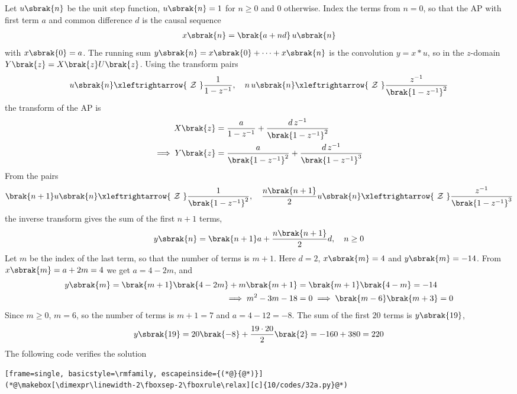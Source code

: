 \begin{enumerate}[label=\thesubsection.\arabic*, ref=\thesubsection.\theenumi]
\solution
Let $u\sbrak{n}$ be the unit step function, $u\sbrak{n} = 1$ for $n \ge 0$ and $0$ otherwise. Index the terms from $n = 0$, so that the AP with first term $a$ and common difference $d$ is the causal sequence
\begin{align}
	x\sbrak{n} = \brak{a + nd}\,u\sbrak{n}
\end{align}
with $x\sbrak{0} = a$. The running sum $y\sbrak{n} = x\sbrak{0} + \cdots + x\sbrak{n}$ is the convolution $y = x * u$, so in the $z$-domain $Y\brak{z} = X\brak{z}U\brak{z}$. Using the transform pairs
\begin{align}
	u\sbrak{n} \xleftrightarrow{\ \mathcal{Z}\ } \frac{1}{1 - z^{-1}}, \quad
	n\,u\sbrak{n} \xleftrightarrow{\ \mathcal{Z}\ } \frac{z^{-1}}{\brak{1 - z^{-1}}^2}
\end{align}
the transform of the AP is
\begin{align}
	X\brak{z} &= \frac{a}{1 - z^{-1}} + \frac{d\,z^{-1}}{\brak{1 - z^{-1}}^2}
	\\
	\implies Y\brak{z} &= \frac{a}{\brak{1 - z^{-1}}^2} + \frac{d\,z^{-1}}{\brak{1 - z^{-1}}^3}
\end{align}
From the pairs
\begin{align}
	\brak{n+1}u\sbrak{n} \xleftrightarrow{\ \mathcal{Z}\ } \frac{1}{\brak{1 - z^{-1}}^2}, \quad
	\frac{n\brak{n+1}}{2}u\sbrak{n} \xleftrightarrow{\ \mathcal{Z}\ } \frac{z^{-1}}{\brak{1 - z^{-1}}^3}
\end{align}
the inverse transform gives the sum of the first $n+1$ terms,
\begin{align}
	y\sbrak{n} = \brak{n+1}a + \frac{n\brak{n+1}}{2}d, \quad n \ge 0
\end{align}
Let $m$ be the index of the last term, so that the number of terms is $m + 1$. Here $d = 2$, $x\sbrak{m} = 4$ and $y\sbrak{m} = -14$. From $x\sbrak{m} = a + 2m = 4$ we get $a = 4 - 2m$, and
\begin{align}
	y\sbrak{m} = \brak{m+1}\brak{4 - 2m} + m\brak{m+1} &= \brak{m+1}\brak{4 - m} = -14
	\\
	\implies m^2 - 3m - 18 &= 0 \implies \brak{m-6}\brak{m+3} = 0
\end{align}
Since $m \ge 0$, $m = 6$, so the number of terms is $m + 1 = 7$ and $a = 4 - 12 = -8$. The sum of the first $20$ terms is $y\sbrak{19}$,
\begin{align}
	y\sbrak{19} = 20\brak{-8} + \frac{19 \cdot 20}{2}\brak{2} = -160 + 380 = 220
\end{align}
The following code verifies the solution
\begin{lstlisting}[frame=single, basicstyle=\rmfamily, escapeinside={(*@}{@*)}]
(*@\makebox[\dimexpr\linewidth-2\fboxsep-2\fboxrule\relax][c]{10/codes/32a.py}@*)
\end{lstlisting}


\end{enumerate}
